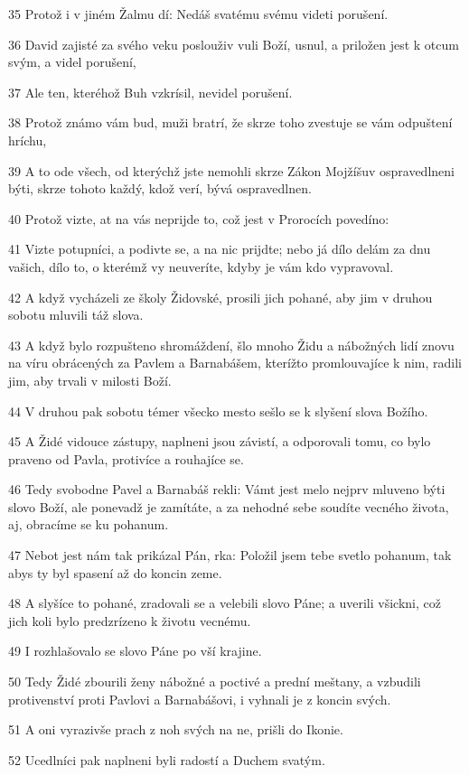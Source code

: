 \par 35 Protož i v jiném Žalmu dí: Nedáš svatému svému videti porušení.
\par 36 David zajisté za svého veku poslouživ vuli Boží, usnul, a priložen jest k otcum svým, a videl porušení,
\par 37 Ale ten, kteréhož Buh vzkrísil, nevidel porušení.
\par 38 Protož známo vám bud, muži bratrí, že skrze toho zvestuje se vám odpuštení hríchu,
\par 39 A to ode všech, od kterýchž jste nemohli skrze Zákon Mojžíšuv ospravedlneni býti, skrze tohoto každý, kdož verí, bývá ospravedlnen.
\par 40 Protož vizte, at na vás neprijde to, což jest v Prorocích povedíno:
\par 41 Vizte potupníci, a podivte se, a na nic prijdte; nebo já dílo delám za dnu vašich, dílo to, o kterémž vy neuveríte, kdyby je vám kdo vypravoval.
\par 42 A když vycházeli ze školy Židovské, prosili jich pohané, aby jim v druhou sobotu mluvili táž slova.
\par 43 A když bylo rozpušteno shromáždení, šlo mnoho Židu a nábožných lidí znovu na víru obrácených za Pavlem a Barnabášem, kterížto promlouvajíce k nim, radili jim, aby trvali v milosti Boží.
\par 44 V druhou pak sobotu témer všecko mesto sešlo se k slyšení slova Božího.
\par 45 A Židé vidouce zástupy, naplneni jsou závistí, a odporovali tomu, co bylo praveno od Pavla, protivíce a rouhajíce se.
\par 46 Tedy svobodne Pavel a Barnabáš rekli: Vámt jest melo nejprv mluveno býti slovo Boží, ale ponevadž je zamítáte, a za nehodné sebe soudíte vecného života, aj, obracíme se ku pohanum.
\par 47 Nebot jest nám tak prikázal Pán, rka: Položil jsem tebe svetlo pohanum, tak abys ty byl spasení až do koncin zeme.
\par 48 A slyšíce to pohané, zradovali se a velebili slovo Páne; a uverili všickni, což jich koli bylo predzrízeno k životu vecnému.
\par 49 I rozhlašovalo se slovo Páne po vší krajine.
\par 50 Tedy Židé zbourili ženy nábožné a poctivé a prední meštany, a vzbudili protivenství proti Pavlovi a Barnabášovi, i vyhnali je z koncin svých.
\par 51 A oni vyrazivše prach z noh svých na ne, prišli do Ikonie.
\par 52 Ucedlníci pak naplneni byli radostí a Duchem svatým.

